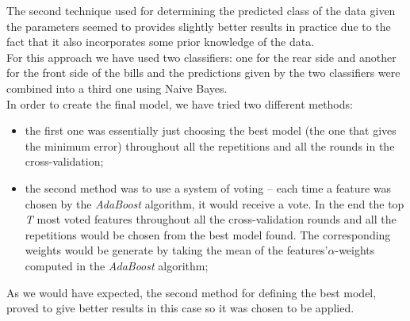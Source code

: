 \documentclass[11pt,twocolumn]{article}
\begin{document}
The second technique used for determining the predicted class of the data given the parameters seemed to provides slightly better results in practice due to the fact that it also incorporates some prior knowledge of the data.\\  
 		\hspace*{10px}For this approach we have used two classifiers: one for the rear side and another for the front side of the bills and the predictions given by the two classifiers were combined into a third one using Naive Bayes.\\
		\hspace*{10px}In order to create the final model, we have tried two different methods: 
\begin{itemize}
\item the first one was essentially just choosing the best model (the one that gives the minimum error) throughout all the repetitions and all the rounds in the cross-validation;
\item the second method was to use a system of voting -- each time a feature was chosen by the \emph{AdaBoost} algorithm, it would receive a vote. In the end the top \emph{T} most voted features throughout all the cross-validation rounds and all the repetitions would be chosen from the best model found. The corresponding weights would be generate by taking the mean of the features\rq\@ $\alpha$-weights computed in the \emph{AdaBoost} algorithm;     
\end{itemize}
As we would have expected, the second method for defining the best model, proved to give better results in this case so it was chosen to be applied.
\end{document}
